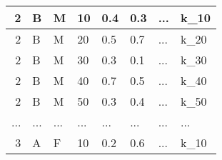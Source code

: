 \documentclass[a4paper,12pt]{article}
\begin{document}
\begin{table}[]
\begin{tabular}{|r|L|L|L|L|L|L|L|}
2                                      & B                                         & M                                   &  10                                & 0.4                               & 0.3                               & ...                                 & k_{10}                            \\ \hline
{} 
2                                      & B                                         & M                                   &  20                                & 0.5                               & 0.7                               & ...                                 & k_{20}                            \\ \hline
{} 
2                                      & B                                         & M                                   &  30                                & 0.3                               & 0.1                               & ...                                 & k_{30}                            \\ \hline
{} 
2                                      & B                                         & M                                   &  40                                & 0.7                               & 0.5                               & ...                                 & k_{40}                            \\ \hline
{} 
2                                      & B                                         & M                                   &  50                                & 0.3                               & 0.4                               & ...                                 & k_{50}                            \\ \hline
...                               & ...                               & ...                               &  ...                               & ...                               & ...                               & ...                                 & ...                                \\ \hline
{} 
3                                      & A                                         & F                                   &  10                                & 0.2                               & 0.6                               & ...                                 & k_{10}                            \\ \hline

\end{tabular}
\end{table}
\end{document}
